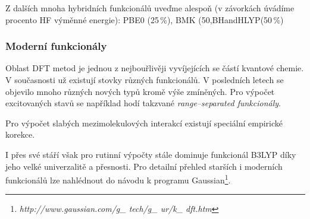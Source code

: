 Z dalších mnoha hybridních funkcionálů uveďme alespoň (v závorkách úvádíme procento HF výměnné energie): PBE0 (25\,\%), BMK (50,BHandHLYP(50\,\%)

\subsubsection{Moderní funkcionály}
Oblast DFT metod je jednou z nejbouřlivěji vyvíjejících se částí kvantové chemie. V současnosti už existují stovky různých funkcionálů. V posledních letech se objevilo mnoho různých nových typů kromě výše zmíněných. Pro výpočet excitovaných stavů se například hodí takzvané \textit{range--separated funkcionály}. 

Pro výpočet slabých mezimolekulových interakcí existují speciální empirické korekce.

I přes své stáří však pro rutinní výpočty stále dominuje funkcionál B3LYP díky jeho velké univerzalitě a přesnosti.
Pro detailní přehled starších i moderních funkcionálů lze nahlédnout do návodu k programu Gaussian\footnote{\textit{http://www.gaussian.com/g\_ tech/g\_ ur/k\_ dft.htm}}.








